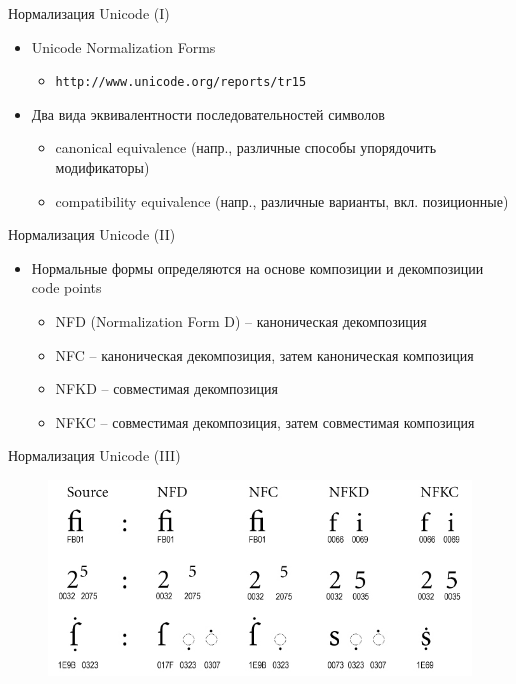 \documentclass{beamer}
\begin{document}
\begin{frame}{Нормализация Unicode (I)}
\begin{itemize}
	\item Unicode Normalization Forms 
	    \begin{itemize}
	        \item \texttt{http://www.unicode.org/reports/tr15}
	    \end{itemize} 
	\medskip
	\item Два вида эквивалентности последовательностей символов
	    \begin{itemize}
	        \item canonical equivalence (напр., различные способы упорядочить модификаторы)
	        \item compatibility equivalence (напр., различные варианты, вкл. позиционные)
	    \end{itemize} 
\end{itemize}
\end{frame}

\begin{frame}{Нормализация Unicode (II)}
\begin{itemize}
	\item Нормальные формы определяются на основе композиции и декомпозиции code points
	    \begin{itemize}
	        \item NFD (Normalization Form D) -- каноническая декомпозиция
	        \item NFC -- каноническая декомпозиция, затем каноническая композиция
	        \item NFKD -- совместимая декомпозиция
	        \item NFKC -- совместимая декомпозиция, затем совместимая композиция
	    \end{itemize} 
\end{itemize}
\end{frame}

\begin{frame}{Нормализация Unicode (III)}
\begin{figure}[H]
    \includegraphics[scale=0.4]{normalized.png} 
\end{figure}
\end{frame}
\end{document}
